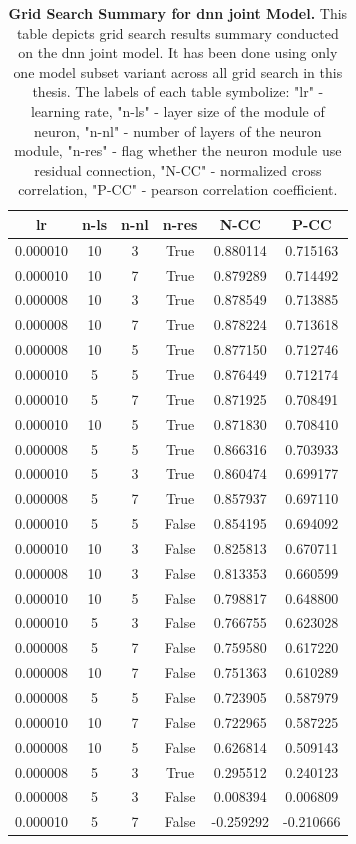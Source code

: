 \begin{table}
    \centering\footnotesize\sf
    \begin{tabular}{cccccc}
    \toprule
    lr & n-ls & n-nl & n-res & N-CC & P-CC \\
    \midrule
    0.000010 & 10 & 3 & True & 0.880114 & 0.715163 \\
    0.000010 & 10 & 7 & True & 0.879289 & 0.714492 \\
    0.000008 & 10 & 3 & True & 0.878549 & 0.713885 \\
    0.000008 & 10 & 7 & True & 0.878224 & 0.713618 \\
    0.000008 & 10 & 5 & True & 0.877150 & 0.712746 \\
    0.000010 & 5 & 5 & True & 0.876449 & 0.712174 \\
    0.000010 & 5 & 7 & True & 0.871925 & 0.708491 \\
    0.000010 & 10 & 5 & True & 0.871830 & 0.708410 \\
    0.000008 & 5 & 5 & True & 0.866316 & 0.703933 \\
    0.000010 & 5 & 3 & True & 0.860474 & 0.699177 \\
    0.000008 & 5 & 7 & True & 0.857937 & 0.697110 \\
    0.000010 & 5 & 5 & False & 0.854195 & 0.694092 \\
    0.000010 & 10 & 3 & False & 0.825813 & 0.670711 \\
    0.000008 & 10 & 3 & False & 0.813353 & 0.660599 \\
    0.000010 & 10 & 5 & False & 0.798817 & 0.648800 \\
    0.000010 & 5 & 3 & False & 0.766755 & 0.623028 \\
    0.000008 & 5 & 7 & False & 0.759580 & 0.617220 \\
    0.000008 & 10 & 7 & False & 0.751363 & 0.610289 \\
    0.000008 & 5 & 5 & False & 0.723905 & 0.587979 \\
    0.000010 & 10 & 7 & False & 0.722965 & 0.587225 \\
    0.000008 & 10 & 5 & False & 0.626814 & 0.509143 \\
    0.000008 & 5 & 3 & True & 0.295512 & 0.240123 \\
    0.000008 & 5 & 3 & False & 0.008394 & 0.006809 \\
    0.000010 & 5 & 7 & False & -0.259292 & -0.210666 \\
    \bottomrule
    \end{tabular}
    \caption{\textbf{Grid Search Summary for dnn joint Model.} This table depicts grid search results summary conducted on the dnn joint model. It has been done using only one model subset variant across all grid search in this thesis. The labels of each table symbolize: "lr" - learning rate, "n-ls" - layer size of the module of neuron, "n-nl" - number of layers of the neuron module, "n-res" - flag whether the neuron module use residual connection, "N-CC" - normalized cross correlation, "P-CC" - pearson correlation coefficient.}
    \label{tab:grid_dnn_joint}
\end{table}

